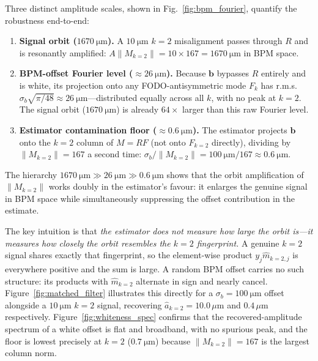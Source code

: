 \documentclass[preprint,12pt]{elsarticle}
\begin{document}
Three distinct amplitude scales, shown in Fig.~\ref{fig:bpm_fourier},
quantify the robustness end-to-end:
\begin{enumerate}
\item \textbf{Signal orbit ($\SI{1670}{\micro\meter}$).}
  A $\SI{10}{\micro\meter}$ $k=2$ misalignment passes through $R$ and is
  resonantly amplified: $A\|M_{k=2}\|=10\times167=\SI{1670}{\micro\meter}$
  in BPM space.
\item \textbf{BPM-offset Fourier level ($\approx\SI{26}{\micro\meter}$).}
  Because $\mathbf{b}$ bypasses $R$ entirely and is white, its projection
  onto any FODO-antisymmetric mode $F_k$ has r.m.s.\
  $\sigma_b\sqrt{\pi/48}\approx\SI{26}{\micro\meter}$---distributed equally
  across all $k$, with no peak at $k=2$.
  The signal orbit ($\SI{1670}{\micro\meter}$) is already $64\times$ larger than
  this raw Fourier level.
\item \textbf{Estimator contamination floor ($\approx\SI{0.6}{\micro\meter}$).}
  The estimator projects $\mathbf{b}$ onto the $k=2$ column of $M=RF$
  (not onto $F_{k=2}$ directly), dividing by $\|M_{k=2}\|=167$ a second
  time: $\sigma_b/\|M_{k=2}\|=\SI{100}{\micro\meter}/167\approx\SI{0.6}{\micro\meter}$.
\end{enumerate}
The hierarchy
$\SI{1670}{\micro\meter}\gg\SI{26}{\micro\meter}\gg\SI{0.6}{\micro\meter}$
shows that the orbit amplification of $\|M_{k=2}\|$ works doubly in
the estimator's favour: it enlarges the genuine signal in BPM space
while simultaneously suppressing the offset contribution in the
estimate.

The key intuition is that \emph{the estimator does not measure how large the
orbit is---it measures how closely the orbit resembles the $k=2$ fingerprint.}
A genuine $k=2$ signal shares exactly that fingerprint, so the element-wise
product $y_j\hat{m}_{k=2,j}$ is everywhere positive and the sum is large.
A random BPM offset carries no such structure: its products with
$\hat{m}_{k=2}$ alternate in sign and nearly cancel.
Figure~\ref{fig:matched_filter} illustrates this directly for a
$\sigma_b=\SI{100}{\micro\meter}$ offset alongside a $\SI{10}{\micro\meter}$
$k=2$ signal, recovering $\hat{a}_{k=2}=10.0\,\mu$m and $0.4\,\mu$m respectively.
Figure~\ref{fig:whiteness_spec} confirms that the recovered-amplitude spectrum
of a white offset is flat and broadband, with no spurious peak, and the floor
is lowest precisely at $k=2$ ($\SI{0.7}{\micro\meter}$) because $\|M_{k=2}\|=167$
is the largest column norm.
\end{document}
